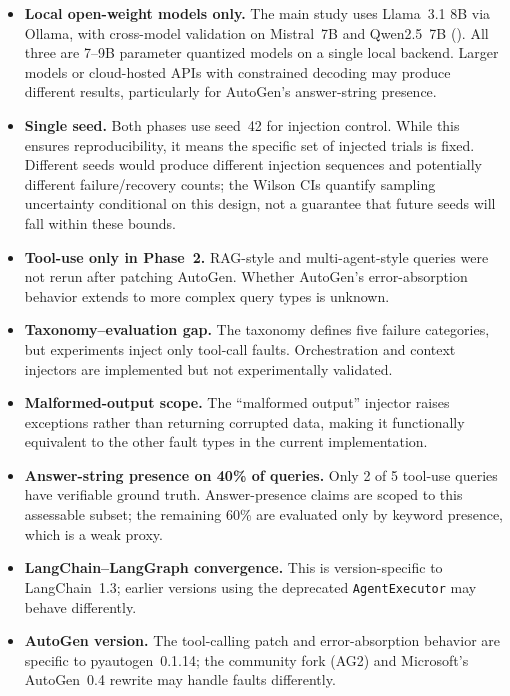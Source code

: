 \documentclass[make,article,submit,moreauthors,pdftex]{mdpi}
\begin{document}
\begin{itemize}
  \item {\color{magenta}\textbf{Local open-weight models only.} The main study uses Llama~3.1 8B via Ollama, with cross-model validation on Mistral~7B and Qwen2.5~7B (). All three are 7--9B parameter quantized models on a single local backend. Larger models or cloud-hosted APIs with constrained decoding may produce different results, particularly for AutoGen's answer-string presence.}
  \item {\color{magenta}\textbf{Single seed.} Both phases use seed~42 for injection control. While this ensures reproducibility, it means the specific set of injected trials is fixed. Different seeds would produce different injection sequences and potentially different failure/recovery counts; the Wilson CIs quantify sampling uncertainty conditional on this design, not a guarantee that future seeds will fall within these bounds.}
  \item {\color{magenta}\textbf{Tool-use only in Phase~2.} RAG-style and multi-agent-style queries were not rerun after patching AutoGen. Whether AutoGen's error-absorption behavior extends to more complex query types is unknown.}
  \item {\color{magenta}\textbf{Taxonomy--evaluation gap.} The taxonomy defines five failure categories, but experiments inject only tool-call faults. Orchestration and context injectors are implemented but not experimentally validated.}
  \item {\color{magenta}\textbf{Malformed-output scope.} The ``malformed output'' injector raises exceptions rather than returning corrupted data, making it functionally equivalent to the other fault types in the current implementation.}
  \item {\color{magenta}\textbf{Answer-string presence on 40\% of queries.} Only 2 of 5 tool-use queries have verifiable ground truth. Answer-presence claims are scoped to this assessable subset; the remaining 60\% are evaluated only by keyword presence, which is a weak proxy.}
  \item {\color{magenta}\textbf{LangChain--LangGraph convergence.} This is version-specific to LangChain~1.3; earlier versions using the deprecated \texttt{AgentExecutor} may behave differently.}
  \item {\color{magenta}\textbf{AutoGen version.} The tool-calling patch and error-absorption behavior are specific to pyautogen~0.1.14; the community fork (AG2) and Microsoft's AutoGen~0.4 rewrite may handle faults differently.}

\end{itemize}
\end{document}
